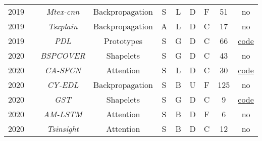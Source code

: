 \begin{table*}[H]
\begin{tabular}{@{}cccccccccc@{}}
    2019        & \cite{assaf_mtex-cnn_2019}                  &\textit{Mtex-cnn}  & Backpropagation&S       & L         & D      & F                        & 51                & no\\ 

    2019        & \cite{munir_tsxplain_2019}            &\textit{Tsxplain}  &  Backpropagation    &A       & L         & D      & C                    & 17                & no\\  

    2019        & \cite{gee_explaining_2019}        &\textit{PDL}       & Prototypes    &S       & G        & D      & C                    & 66                & \href{https://github.com/alangee/ijcai19-ts-prototypes}{code} \\ 

    2020        & \cite{li_efficient_2022}                   &\textit{\footnotesize{BSPCOVER}}  & Shapelets     & S      & G        & D      & C                    & 43               & no\\  

    
    2020        & \cite{hao_new_2020}                 &\textit{CA-SFCN}   & Attention     &S       & L         & D      & C                    & 30                & \href{https://github.com/huipingcao/nmsu_yhao_ijcai2020}{code}\\ 

    2020        &   \cite{wolanin_estimating_2020}       & \textit{CY-EDL}   & Backpropagation     &S       & B          & U   & F                          & 125               & no \\

    2020        & \cite{kidger_generalised_2020}& \textit{GST}      & Shapelets     &S       & G        & D      & C                    & 9                 & \href{https://github.com/patrick-kidger/generalised_shapelets}{code}\\  

    2020        & \cite{schockaert_attention_2020} & \textit{\footnotesize{AM-LSTM}}& Attention&S       & B          & D      & F                       & 6                 & no\\ 

    2020        & \cite{siddiqui_tsinsight_2020}& \textit{Tsinsight}& Attention   &S       &B           & D      & C                    & 12                & no \\ 


\end{tabular}
\end{table*}
